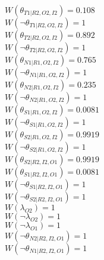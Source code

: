 $W(\theta_{T1|R2,O2,I2})=0.108$\\
$W(\neg\theta_{T1|R2,O2,I2})=1$\\
$W(\theta_{T2|R2,O2,I2})=0.892$\\
$W(\neg\theta_{T2|R2,O2,I2})=1$\\
$W(\theta_{N1|R1,O2,I2})=0.765$\\
$W(\neg\theta_{N1|R1,O2,I2})=1$\\
$W(\theta_{N2|R1,O2,I2})=0.235$\\
$W(\neg\theta_{N2|R1,O2,I2})=1$\\
$W(\theta_{S1|R1,O2,I2})=0.0081$\\
$W(\neg\theta_{S1|R1,O2,I2})=1$\\
$W(\theta_{S2|R1,O2,I2})=0.9919$\\
$W(\neg\theta_{S2|R1,O2,I2})=1$\\
$W(\theta_{S2|R2,I2,O1})=0.9919$\\
$W(\theta_{S1|R2,I2,O1})=0.0081$\\
$W(\neg\theta_{S1|R2,I2,O1})=1$\\
$W(\neg\theta_{S2|R2,I2,O1})=1$\\
$W(\lambda_{O2})=1$\\
$W(\neg\lambda_{O2})=1$\\
$W(\neg\lambda_{O1})=1$\\
$W(\neg\theta_{N2|R2,I2,O1})=1$\\
$W(\neg\theta_{N1|R2,I2,O1})=1$\\
